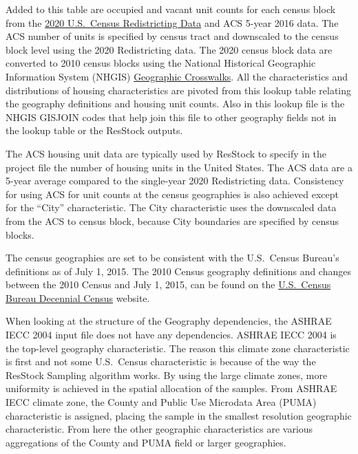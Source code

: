 Added to this table are occupied and vacant unit counts for each census block from the \href{https://www.census.gov/programs-surveys/decennial-census/about/rdo.html}{2020 U.S.~Census Redistricting Data} and ACS 5-year 2016 data. The ACS number of units is specified by census tract and downscaled to the census block level using the 2020 Redistricting data. The 2020 census block data are converted to 2010 census blocks using the National Historical Geographic Information System (NHGIS) \href{https://www.nhgis.org/geographic-crosswalks}{Geographic Crosswalks}. All the characteristics and distributions of housing characteristics are pivoted from this lookup table relating the geography definitions and housing unit counts. Also in this lookup file is the NHGIS GISJOIN codes that help join this file to other geography fields not in the lookup table or the ResStock outputs.

The ACS housing unit data are typically used by ResStock to specify in the project file the number of housing units in the United States. The ACS data are a 5-year average compared to the single-year 2020 Redistricting data. Consistency for using ACS for unit counts at the census geographies is also achieved except for the ``City'' characteristic. The City characteristic uses the downscaled data from the ACS to census block, because City boundaries are specified by census blocks. 

The census geographies are set to be consistent with the U.S.~Census Bureau's definitions as of July 1, 2015. The 2010 Census geography definitions and changes between the 2010 Census and July 1, 2015, can be found on the \href{https://www.census.gov/programs-surveys/decennial-census/decade.html}{U.S.~Census Bureau Decennial Census} website.

When looking at the structure of the Geography dependencies, the ASHRAE IECC 2004 input file does not have any dependencies. ASHRAE IECC 2004 is the top-level geography characteristic. The reason this climate zone characteristic is first and not some U.S.~Census characteristic is because of the way the ResStock Sampling algorithm works. By using the large climate zones, more uniformity is achieved in the spatial allocation of the samples. From ASHRAE IECC climate zone, the County and Public Use Microdata Area (PUMA) characteristic is assigned, placing the sample in the smallest resolution geographic characteristic. From here the other geographic characteristics are various aggregations of the County and PUMA field or larger geographies.

